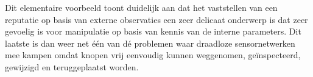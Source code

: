Dit elementaire voorbeeld toont duidelijk aan dat het vaststellen van een
reputatie op basis van externe observaties een zeer delicaat onderwerp is dat
zeer gevoelig is voor manipulatie op basis van kennis van de interne
parameters. Dit laatste is dan weer net \'e\'en van d\'e problemen waar
draadloze sensornetwerken mee kampen omdat knopen vrij eenvoudig kunnen
weggenomen, ge\"inspecteerd, gewijzigd en teruggeplaatst worden.
